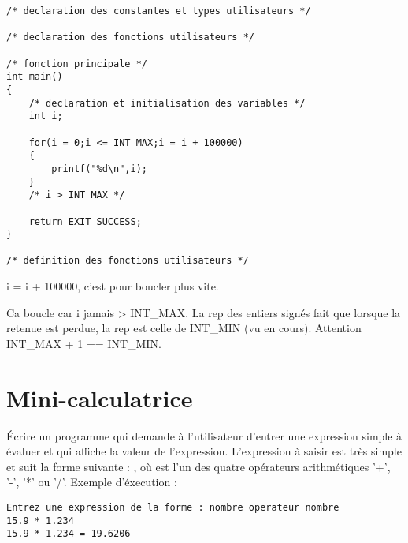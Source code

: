 \begin{enumerate}
\begin{small}
\begin{verbatim}
/* declaration des constantes et types utilisateurs */

/* declaration des fonctions utilisateurs */

/* fonction principale */
int main()
{
    /* declaration et initialisation des variables */
    int i;

    for(i = 0;i <= INT_MAX;i = i + 100000)
    {
        printf("%d\n",i);
    }
    /* i > INT_MAX */

    return EXIT_SUCCESS;
}

/* definition des fonctions utilisateurs */
\end{verbatim}
\end{small}
  \begin{correction}
    i = i + 100000, c'est pour boucler plus vite.

    Ca boucle car i jamais > INT\_MAX. La rep des entiers signés fait que lorsque la retenue est perdue, la rep est celle de INT\_MIN (vu en cours). Attention INT\_MAX + 1 == INT\_MIN.
  \end{correction}
\end{enumerate}

\section{Mini-calculatrice}
\label{intro}

Écrire un programme qui demande à l'utilisateur d'entrer une
expression simple à évaluer et qui affiche la valeur de l'expression.
L'expression à saisir est très simple et suit la forme suivante :
, où  est l'un des quatre
opérateurs arithmétiques '+', '-', '*' ou '/'. Exemple d'éxecution :
\begin{small}
\begin{verbatim}
Entrez une expression de la forme : nombre operateur nombre
15.9 * 1.234
15.9 * 1.234 = 19.6206
\end{verbatim}

\end{small}

